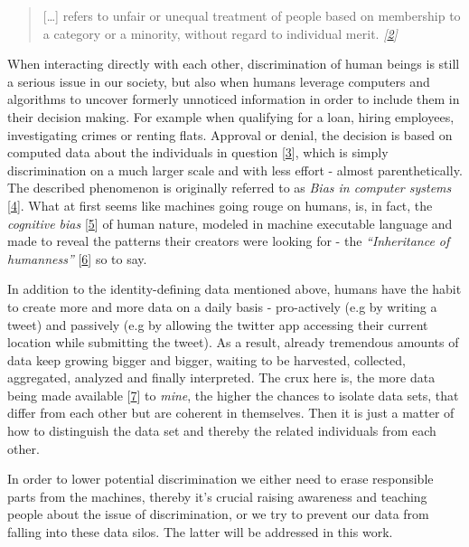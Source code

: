 \documentclass[12pt,english,a4paper,titlepage,cleardoublepage=empty,dottedtoc]{report}
\begin{document}
\begin{quote}
{[}\ldots{}{]} refers to unfair or unequal treatment of people based on
membership to a category or a minority, without regard to individual
merit.
\emph{{[}\protect\hyperlink{ref-paper_2008_discrimination-aware-data-mining}{2}{]}}
\end{quote}

When interacting directly with each other, discrimination of human
beings is still a serious issue in our society, but also when humans
leverage computers and algorithms to uncover formerly unnoticed
information in order to include them in their decision making. For
example when qualifying for a loan, hiring employees, investigating
crimes or renting flats. Approval or denial, the decision is based on
computed data about the individuals in question
{[}\protect\hyperlink{ref-book_2015_ethical-it-innovation_ethical-uses-of-information-and-knowledge}{3}{]},
which is simply discrimination on a much larger scale and with less
effort - almost parenthetically. The described phenomenon is originally
referred to as \emph{Bias in computer systems}
{[}\protect\hyperlink{ref-paper_1996_bias-in-computer-systems}{4}{]}.
What at first seems like machines going rouge on humans, is, in fact,
the \emph{cognitive bias}
{[}\protect\hyperlink{ref-wikipedia_2016_cognitive-bias}{5}{]} of human
nature, modeled in machine executable language and made to reveal the
patterns their creators were looking for - the \emph{``Inheritance of
humanness''}
{[}\protect\hyperlink{ref-web_2016_big-data-is-people}{6}{]} so to say.

In addition to the identity-defining data mentioned above, humans have
the habit to create more and more data on a daily basis - pro-actively
(e.g by writing a tweet) and passively (e.g by allowing the twitter app
accessing their current location while submitting the tweet). As a
result, already tremendous amounts of data keep growing bigger and
bigger, waiting to be harvested, collected, aggregated, analyzed and
finally interpreted. The crux here is, the more data being made
available
{[}\protect\hyperlink{ref-video_2015_big-data-and-deep-learning_discrimination}{7}{]}
to \emph{mine}, the higher the chances to isolate data sets, that differ
from each other but are coherent in themselves. Then it is just a matter
of how to distinguish the data set and thereby the related individuals
from each other.

In order to lower potential discrimination we either need to erase
responsible parts from the machines, thereby it's crucial raising
awareness and teaching people about the issue of discrimination, or we
try to prevent our data from falling into these data silos. The latter
will be addressed in this work.
\end{document}
